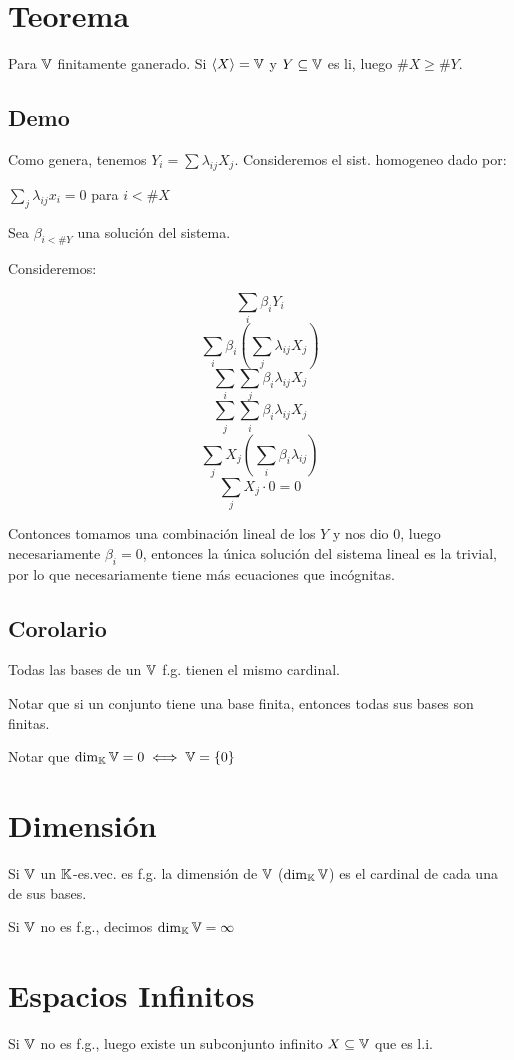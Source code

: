 \documentclass{article}
\begin{document}
\section{Teorema}
Para $\mathbb{V}$ finitamente ganerado.
Si $\langle X \rangle = \mathbb{V}$ y $Y \subseteq \mathbb{V}$ es li, luego $\# X \geq \#Y$.

\subsection{Demo}

Como genera, tenemos $Y_i = \sum \lambda_{ij} X_j$. Consideremos el sist.
homogeneo dado por:

$\sum_j \lambda_{ij} x_{i} = 0$ para $i < \# X$

Sea $\beta_{i < \# Y}$ una solución del sistema.

Consideremos:

\[\sum_i \beta_i Y_i\]
\[\sum_i \beta_i \left(\sum_j \lambda_{ij} X_j\right)\]
\[\sum_i \sum_j \beta_i \lambda_{ij} X_j\]
\[\sum_j \sum_i \beta_i \lambda_{ij} X_j\]
\[\sum_j X_j \left(\sum_i \beta_i \lambda_{ij} \right)\]
\[\sum_j X_j \cdot 0 = 0\]

Contonces tomamos una combinación lineal de los $Y$ y nos dio $0$, luego
necesariamente $\beta_i = 0$, entonces la única solución del sistema lineal
es la trivial, por lo que necesariamente tiene más ecuaciones que incógnitas.

\subsection{Corolario}
Todas las bases de un $\mathbb{V}$ f.g. tienen el mismo cardinal.

Notar que si un conjunto tiene una base finita, entonces todas sus bases son finitas.

Notar que $\dim_{\mathbb{K}} \mathbb{V} = 0 \iff \mathbb{V} = \{0\}$

\section{Dimensión}
Si $\mathbb{V}$ un $\mathbb{K}$-es.vec. es f.g.
la dimensión de $\mathbb{V}$ ($\dim_{\mathbb{K}} \mathbb{V}$) es el cardinal de cada una de sus bases.

Si $\mathbb{V}$ no es f.g., decimos $\dim_{\mathbb{K}} \mathbb{V} = \infty$

\section{Espacios Infinitos}
Si $\mathbb{V}$ no es f.g., luego existe un subconjunto infinito $X \subseteq \mathbb{V}$ que es l.i.
\end{document}
